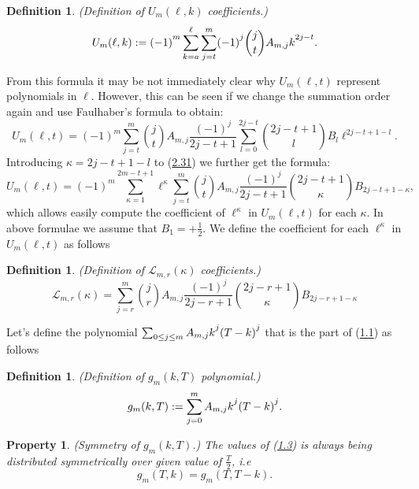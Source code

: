 \documentclass[11pt, letterpaper]{amsart}
\newtheorem{ppty}[thm]{Property}
\theoremstyle{definition}
\newtheorem{defn}[thm]{Definition}
\theoremstyle{remark}
\numberwithin{equation}{section}
\begin{document}
\begin{defn}
\textit{(Definition of $U_m(\ell, k)$ coefficients.)}
\begin{equation*}
U_m(\ell, k) := (-1)\strut^m \sum_{k=a}^{\ell}\sum_{j=t}^m (-1)\strut^j\binom{j}{t}A_{m,j}k\strut^{2j-t}.
\end{equation*}
\end{defn}
From this formula it may be not immediately clear why $U_m(\ell,t)$ represent polynomials in $\ell$. However, this can be seen if we change the summation order again and use Faulhaber's formula to obtain:
\begin{equation}\label{maxal1}
U_m(\ell,t) = (-1)^m \sum_{j=t}^m \binom{j}{t}A_{m,j} \frac{(-1)^j}{2j-t+1}\sum_{l=0}^{2j-t} \binom{2j-t+1}{l}B_{l}\ell^{2j-t+1-l}.
\end{equation}
Introducing $\kappa=2j-t+1-l$ to (\hyperref[maxal1]{2.31}) we further get the formula:
\begin{equation}
U_m(\ell,t) = (-1)^m \sum_{\kappa=1}^{2m-t+1} \ell^\kappa \sum_{j=t}^m \binom{j}{t}A_{m,j} \frac{(-1)^j}{2j-t+1}\binom{2j-t+1}{\kappa}B_{2j-t+1-\kappa},
\end{equation}
which allows easily compute the coefficient of $\ell^{\kappa}$ in $U_m(\ell,t)$ for each $\kappa$. In above formulae we assume that $B_1=+\frac12$. We define the coefficient for each $\ell^{\kappa}$ in $U_m(\ell,t)$ as follows
\begin{defn} \textit{(Definition of $\mathscr{L}_{m,r}(\kappa)$ coefficients.)}
\begin{equation*}
\mathscr{L}_{m,r}(\kappa)=\sum_{j=r}^{m} \binom{j}{r}A_{m,j} \frac{(-1)^j}{2j-r+1}\binom{2j-r+1}{\kappa}B_{2j-r+1-\kappa}
\end{equation*}
\end{defn}
Let's define the polynomial $\sum\nolimits_{0\leq j \leq m} A_{m,j}k\strut^j(T-k)\strut^j$ that is the part of (\hyperref[f1]{1.1}) as follows
\begin{defn} \label{symmetry_1} \textit{(Definition of $g_m(k,T)$ polynomial.)}
\begin{equation*}
g_m(k,T) := \sum_{j=0}^{m} A_{m,j}k\strut^j(T-k)\strut^j.
\end{equation*}
\end{defn}
\begin{ppty}\label{symmetry_2} (Symmetry of $g_m(k,T)$.)
The values of (\hyperref[symmetry_2]{1.3}) is always being distributed symmetrically over given value of $\tfrac{T}{2}$, i.e
\begin{equation*}
g_m(T,k)=g_m(T,T-k).
\end{equation*}
\end{ppty}
\end{document}
